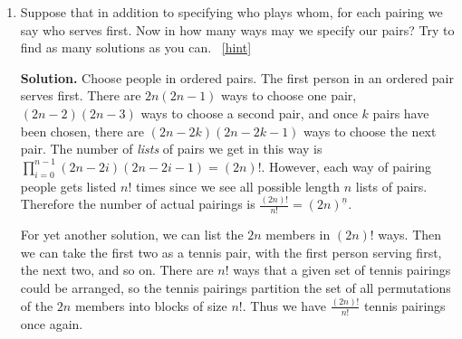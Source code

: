 \documentclass{book}
\begin{document}
\begin{activity}[]
\begin{enumerate}[font=\bfseries,label=(\alph*),ref=\alph*]
\item\label{task-149} \hypertarget{p-816}{}%
Suppose that in addition to specifying who plays whom, for each pairing we say who serves first.  Now in how many ways may we specify our pairs? Try to find as many solutions as you can.%
~\hfill{\tiny\hyperlink{a-112.b}{[hint]}\hypertarget{q-112.b}{}}\par\smallskip%
\noindent\textbf{Solution.}\hypertarget{solution-86}{}\quad%
\hypertarget{p-818}{}%
Choose people in ordered pairs.  The first person in an ordered pair serves first.  There are \(2n(2n-1)\) ways to choose one pair, \((2n-2)(2n-3)\) ways to choose a second pair, and once \(k\) pairs have been chosen, there are \((2n-2k)(2n-2k-1)\) ways to choose the next pair.  The number of \emph{lists} of pairs we get in this way is \(\prod_{i=0}^{n-1} (2n-2i)(2n-2i-1) = (2n)!\). However, each way of pairing people gets listed \(n!\) times since we see all possible length \(n\) lists of pairs.  Therefore the number of actual pairings is \(\frac{(2n)!}{n!} = (2n)^{\underline{n}}\).%
\par
\hypertarget{p-819}{}%
For yet another solution, we can list the \(2n\) members in \((2n)!\) ways. Then we can take the first two as a tennis pair, with the first person serving first, the next two, and so on. There are \(n!\) ways that a given set of tennis pairings could be arranged, so the tennis pairings partition the set of all permutations of the \(2n\) members into blocks of size \(n!\). Thus we have \(\frac{(2n)!}{n!}\) tennis pairings once again.%
\end{enumerate}
\end{activity}
\end{document}
